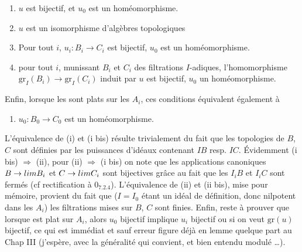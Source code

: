 \documentclass[11pt,a4paper]{article}
\begin{document}
\begin{enumerate}
  \item[(i)] $u$ est  bijectif, et $u_0$ est un
    homéomorphisme.
  \item[(i bis)] $u$ est un isomorphisme d'algèbres topologiques
  \item[(ii)] Pour tout $i$, $u_i : B_i \to C_i$ est bijectif, $u_0$ est un
    homéomorphisme.
  \item[(ii bis)] pour tout $i$, munissant $B_i$ et $C_i$ des filtrations
    $I$-adiques, l'homomorphisme $\mathrm{gr}_I(B_i) \to \mathrm{gr}_I(C_i)$
    induit par $u$ est bijectif, $u_0$ un homéomorphisme.
\end{enumerate}

\marginal{\ill{}}

Enfin, lorsque les   sont plats sur les $A_i$, ces conditions
équivalent également à

\begin{enumerate}
  \item[(iii)] $u_0 : B_0 \to C_0$ est un 
    homéomorphisme.
\end{enumerate}

L'équivalence de (i) et (i bis) résulte trivialement du fait que les topologies
de $B$, $C$ sont  définies par les puissances d'idéaux
contenant $IB$ resp. $IC$.  Évidemment (i bis) $\Rightarrow$
(ii), pour (ii) $\Rightarrow$ (i bis) on note que les applications canoniques
$B \to \varprojlim B_i$ et $C \to \varprojlim C_i$ sont bijectives grâce au
fait que les $I_iB$ et $I_iC$ sont fermés (cf rectification à $0_{7.2.4}$).
L'équivalence de (ii) et (ii bis),  mise pour mémoire, provient du
fait que ($I = I_0$ étant un idéal de définition, donc nilpotent dans les
$A_i$) les filtrations mises sur $B$, $C$ sont finies. Enfin, reste à prouver
que lorsque \struck{\ill{}}   est plat sur $A_i$, alors $u_0$ bijectif
implique $u_i$ bijectif ou si on veut $\mathrm{gr}(u)$ bijectif, ce qui est
immédiat et sauf erreur figure déjà en lemme quelque part au Chap III
(j'espère, avec la généralité qui convient, et bien entendu modulé \ldots).
\end{document}
